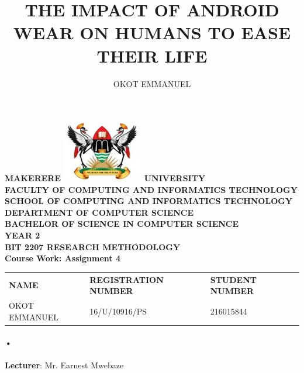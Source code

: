 \documentclass[7pt]{article}
\begin{document}
\begin{Huge}
\begin{center}
\begin{normalsize}
\textbf{MAKERERE \includegraphics[scale=0.5]{logo} UNIVERSITY }\\

\textbf{FACULTY OF COMPUTING AND INFORMATICS TECHNOLOGY} \\
\textbf{SCHOOL OF COMPUTING AND INFORMATICS TECHNOLOGY} \\
\textbf{DEPARTMENT OF COMPUTER SCIENCE} \\
\textbf{BACHELOR OF SCIENCE IN COMPUTER SCIENCE} \\
\textbf{YEAR 2} \\
\textbf{BIT 2207 RESEARCH METHODOLOGY} \\
\textbf{Course Work: Assignment 4}\\
\end{normalsize}
\end{center}
\end{Huge}

\begin{center}
\begin{tabular}{l l l}
\textbf{NAME}  & \textbf{REGISTRATION NUMBER} & \textbf{STUDENT NUMBER} \\
OKOT EMMANUEL& 16/U/10916/PS & 216015844 \\
\end{tabular}

\paragraph{•}
\textbf{Lecturer}: Mr. Earnest Mwebaze
\end{center}

\newpage

\title{THE IMPACT OF ANDROID WEAR ON HUMANS TO EASE THEIR LIFE}
\author{OKOT EMMANUEL}      
\renewcommand{\today}{}

\maketitle

\newpage
\end{document}

